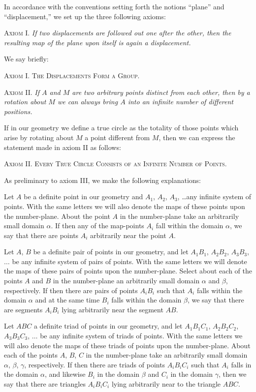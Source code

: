 \documentclass[11pt,oneside]{book}
\begin{document}
In accordance with the conventions setting forth
the notions ``plane'' and ``displacement,'' we set up
the three following axioms:

{\scshape Axiom I.} \textit{If two displacements are followed out one
after the other, then the resulting map of the plane
upon itself is again a displacement.}

We say briefly:

{\scshape Axiom I\@. The Displacements Form a Group.}

{\scshape Axiom II.} \textit{If $A$ and $M$ are two arbitrary points
distinct from each other, then by a rotation about
$M$ we can always bring $A$ into an infinite number
of different positions.}

If in our geometry we define a true circle as the totality
of those points which arise by rotating about $M$
a point different from $M$, then we can express the
statement made in axiom II as follows:

{\scshape Axiom II\@. Every True Circle Consists of an
Infinite Number of Points.}

As preliminary to axiom III, we make the following
explanations:

Let $A$ be a definite point in our geometry and $A_1$,
$A_2$, $A_3$, \ldots any infinite system of points. With the
same letters we will also denote the maps of these
points upon the number-plane. About the point $A$
in the number-plane take an arbitrarily small domain
$\alpha$. If then any of the map-points $A_i$ fall within the
domain $\alpha$, we say that there are points $A_i$ arbitrarily
near the point $A$.

Let $A$, $B$ be a definite pair of points in our geometry,
and let $A_1B_1$, $A_2B_2$, $A_3B_3$, $\ldots$ be any infinite system
of pairs of points. With the same letters we will
denote the maps of these pairs of points upon the
number-plane. Select about each of the points $A$
and $B$ in the number-plane an arbitrarily small domain
$\alpha$ and $\beta$, respectively. If then there are pairs of
points $A_iB_i$ such that $A_i$ falls within the domain $\alpha$ and
at the same time $B_i$ falls within the domain $\beta$, we say
that there are segments $A_iB_i$ lying arbitrarily near the
segment $AB$.

Let $ABC$ a definite triad of points in our geometry,
and let $A_1B_1C_1$, $A_2B_2C_2$, $A_3B_3C_3$, $\ldots$ be any infinite
system of triads of points. With the same letters
we will also denote the maps of these triads of
points upon the number-plane. About each of the
points $A$, $B$, $C$ in the number-plane take an arbitrarily
small domain $\alpha$, $\beta$, $\gamma$, respectively. If then there are
triads of points $A_iB_iC_i$ such that $A_i$ falls in the domain
$\alpha$, and likewise  $B_i$ in the domain $\beta$ and $C_i$ in the
domain $\gamma$, then we say that there are triangles $A_iB_iC_i$
lying arbitrarily near to the triangle $ABC$.
\end{document}
